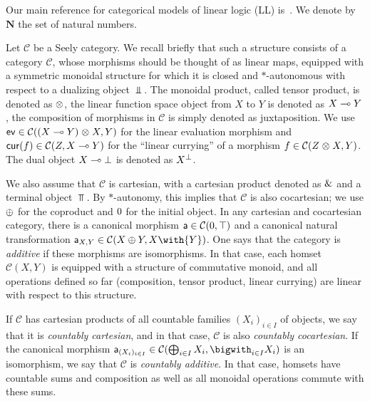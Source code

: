 \documentclass{LMCS}
\newcommand{\nat}{\mathbf{N}}
\newcommand{\With}[2]{{#1}\with{#2}}
\newcommand{\scC}{\mathcal{C}}
\begin{document}
Our main reference for categorical models of linear logic (LL) is~\cite{Mellies09}.
We denote by $\nat$ the set of natural numbers.

Let $\scC$ be a Seely category. We recall briefly that such a structure consists
of a category $\scC$, whose morphisms should be thought of as linear maps,
equipped with a symmetric monoidal structure for which it is closed and
$*$-autonomous with respect to a dualizing object $\Bot$. The monoidal product, called
tensor product, is denoted as $\mathrel\otimes$, the linear function space object from
$X$ to $Y$ is denoted as ${X}\multimap{Y}$, the composition of morphisms in $\scC$ is simply denoted 
as juxtaposition. 
We use $\Evlin\in\scC(\Tens{(\Limpl
  XY)}X,Y)$ for the linear evaluation morphism and $\Curlin f\in\scC(Z,\Limpl
XY)$ for the ``linear currying'' of a morphism $f\in\scC(\Tens ZX,Y)$. The
dual object ${X}\multimap{{\mathord{\perp}}}$ is denoted as ${X}^{\mathord{\perp}}$. 



We also assume that $\scC$ is cartesian, with a cartesian product denoted as
$\mathrel{\&}$ and a terminal object $\Top$. By $*$-autonomy, this implies that $\scC$
is also cocartesian; we use $\oplus$ for the coproduct and $0$ for the
initial object. In any cartesian and cocartesian category, there is a canonical
morphism $\Canadd\in\scC(\Zero,\Top)$ and a canonical natural transformation
$\Canadd_{X,Y}\in\scC(\Plus XY,\With XY)$. One says that the category is
\emph{additive} if these morphisms are isomorphisms. In that case, each homset
$\scC(X,Y)$ is equipped with a structure of commutative monoid, and all
operations defined so far (composition, tensor product, linear currying)
are linear with respect to this structure.

If $\scC$ has cartesian products of all countable families $(X_i)_{i\in I}$ of
objects, we say that it is \emph{countably cartesian}, and in that case, $\scC$ is also
\emph{countably cocartesian}. If the canonical morphism $\Canadd_{\Family
 {X_i}iI}\in\scC(\bigoplus_{i\in I}X_i,\BWith_{i\in I}X_i)$ is an isomorphism, we
say that $\scC$ is \emph{countably additive}. In that case, homsets have countable
sums and composition as well as all monoidal operations commute with these sums.
\end{document}
